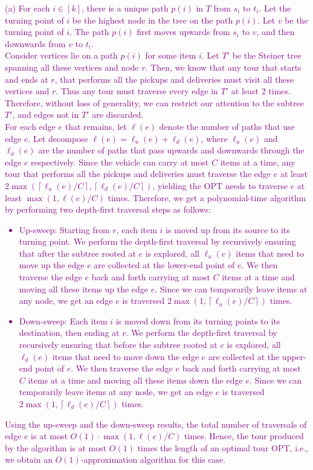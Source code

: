 \documentclass[11pt]{article}
\begin{document}
\textcolor{purple}{
    (a) For each $i \in [k]$, there is a unique path $p(i)$ in $T$ from $s_i$ to $t_i$. Let the turning point of $i$ be the highest node in the tree on the path $p(i)$. Let $v$ be the turning point of $i$. The path $p(i)$ first moves upwards from $s_i$ to $v$, and then downwards from $v$ to $t_i$.\\
    Consider vertices lie on a path $p(i)$ for some item $i$. Let $T'$ be the Steiner tree spanning all these vertices and node $r$. Then, we know that any tour that starts and ends at $r$, that performs all the pickups and deliveries must visit all these vertices and $r$. Thus any tour must traverse every edge in $T'$ at least $2$ times. Therefore, without loss of generality, we can restrict our attention to the subtree $T'$, and edges not in $T'$ are discarded.\\
    For each edge $e$ that remains, let $\ell(e)$ denote the number of paths that use edge $e$. Let decompose $\ell(e)=\ell_u(e) + \ell_d(e)$, where $\ell_u(e)$ and $\ell_d(e)$ are the number of paths that pass upwards and downwards through the edge $e$ respectively. Since the vehicle can carry at most $C$ items at a time, any tour that performs all the pickups and deliveries must traverse the edge $e$ at least $2\max(\left\lceil\ell_u(e)/C\right\rceil,\left\lceil\ell_d(e)/C\right\rceil)$, yielding the OPT needs to traverse $e$ at least $\max(1,\ell(e) / C)$ times. Therefore, we get a polynomial-time algorithm by performing two depth-first traversal steps as follows:
    \begin{itemize}
        \item Up-sweep: Starting from $r$, each item $i$ is moved up from its source to its turning point. We perform the depth-first traversal by recursively ensuring that after the subtree rooted at $e$ is explored, all $\ell_u(e)$ items that need to move up the edge $e$ are collected at the lower-end point of $e$. We then traverse the edge $e$ back and forth carrying at most $C$ items at a time and moving all these items up the edge $e$. Since we can temporarily leave items at any node, we get an edge $e$ is traversed $2\max\left(1,\left\lceil\ell_u(e)/C\right\rceil\right)$ times.
        \item Down-sweep: Each item $i$ is moved down from its turning points to its destination, then ending at $r$. We perform the depth-first traversal by recursively ensuring that before the subtree rooted at $e$ is explored, all $\ell_d(e)$ items that need to move down the edge $e$ are collected at the upper-end point of $e$. We then traverse the edge $e$ back and forth carrying at most $C$ items at a time and moving all these items down the edge $e$. Since we can temporarily leave items at any node, we get an edge $e$ is traversed $2\max\left(1,\left\lceil\ell_d(e)/C\right\rceil\right)$ times.
    \end{itemize}
    Using the up-sweep and the down-sweep results, the total number of traversals of edge $e$ is at most $O(1) \cdot \max(1,\ell(e) / C)$ times. Hence, the tour produced by the algorithm is at most $O(1)$ times the length of an optimal tour OPT, i.e., we obtain an $O(1)$-approximation algorithm for this case.
}
\end{document}
